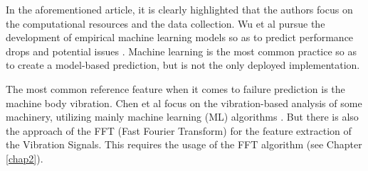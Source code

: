 {In the aforementioned article, it is clearly highlighted that the authors focus on the computational resources and the data collection. Wu et al pursue the development of empirical machine learning models so as to predict performance drops and potential issues \cite{WU2025}. Machine learning is the most common practice so as to create a model-based prediction, but is not the only deployed implementation.

The most common reference feature when it comes to failure prediction is the machine body vibration. Chen et al focus on the vibration-based analysis of some machinery, utilizing mainly machine learning (ML) algorithms \cite{Chen2017}. But there is also the approach of the FFT (Fast Fourier Transform) for the feature extraction of the Vibration Signals. This requires the usage of the FFT algorithm (see Chapter \ref{chap2}).
}
 


